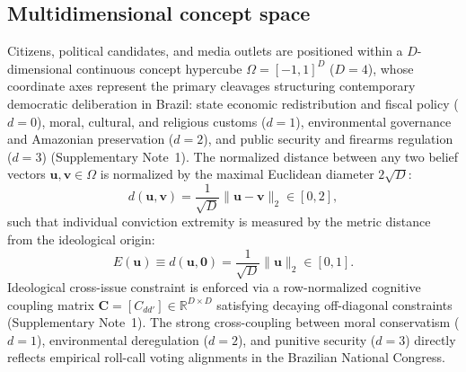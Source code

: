 \documentclass[11pt,a4paper]{article}
\begin{document}
\subsection*{Multidimensional concept space}
Citizens, political candidates, and media outlets are positioned within a $D$-dimensional continuous concept hypercube $\Omega = [-1, 1]^D$ ($D = 4$), whose coordinate axes represent the primary cleavages structuring contemporary democratic deliberation in Brazil: state economic redistribution and fiscal policy ($d=0$), moral, cultural, and religious customs ($d=1$), environmental governance and Amazonian preservation ($d=2$), and public security and firearms regulation ($d=3$) (Supplementary Note~1). The normalized distance between any two belief vectors $\mathbf{u}, \mathbf{v} \in \Omega$ is normalized by the maximal Euclidean diameter $2\sqrt{D}$:
\begin{equation}
    d(\mathbf{u}, \mathbf{v}) = \frac{1}{\sqrt{D}} \|\mathbf{u} - \mathbf{v}\|_2 \in [0, 2],
    \label{eq:methods_distance}
\end{equation}
such that individual conviction extremity is measured by the metric distance from the ideological origin:
\begin{equation}
    E(\mathbf{u}) \equiv d(\mathbf{u}, \mathbf{0}) = \frac{1}{\sqrt{D}} \|\mathbf{u}\|_2 \in [0, 1].
    \label{eq:methods_extremity}
\end{equation}
Ideological cross-issue constraint is enforced via a row-normalized cognitive coupling matrix $\mathbf{C} = [C_{dd'}] \in \mathbb{R}^{D \times D}$ satisfying decaying off-diagonal constraints (Supplementary Note~1). The strong cross-coupling between moral conservatism ($d=1$), environmental deregulation ($d=2$), and punitive security ($d=3$) directly reflects empirical roll-call voting alignments in the Brazilian National Congress.
\end{document}
